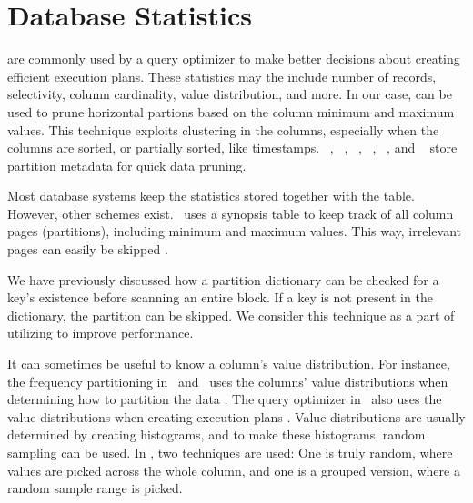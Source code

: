 \section{Database Statistics}
\label{sec:Database Statistics}
 are commonly used by a query optimizer to make better decisions about creating efficient execution plans. These statistics may the include number of records, selectivity, column cardinality, value distribution, and more. In our case,  can be used to prune horizontal partions based on the column minimum and maximum values. This technique exploits clustering in the columns, especially when the columns are sorted, or partially sorted, like timestamps. \oracle~\cite{Lahiri2015-mz}, \ibm~\cite{Raman2013-em}, \vertica~\cite{Lamb2012-kg}, \monetx~\cite{Boncz2005-wj}, \mssql~\cite{Larson2013-mc}, and \exasol~\cite{Exasol2014-xh} store partition metadata for quick data pruning.

Most database systems keep the statistics stored together with the table. However, other schemes exist. \ibm~uses a synopsis table to keep track of all column pages (partitions), including minimum and maximum values. This way, irrelevant pages can easily be skipped \cite{Raman2013-em}.

We have previously discussed how a partition dictionary can be checked for a key's existence before scanning an entire block. If a key is not present in the dictionary, the partition can be skipped. We consider this technique as a part of utilizing  to improve performance.

It can sometimes be useful to know a column's value distribution. For instance, the frequency partitioning in \blink~and \ibm~uses the columns' value distributions when determining how to partition the data \cite{Raman2008-gi, Raman2013-em}. The query optimizer in \mssql~also uses the value distributions when creating execution plans \cite{Larson2013-mc}. Value distributions are usually determined by creating histograms, and to make these histograms, random sampling can be used. In \mssql, two techniques are used: One is truly random, where values are picked across the whole column, and one is a grouped version, where a random sample range is picked.

